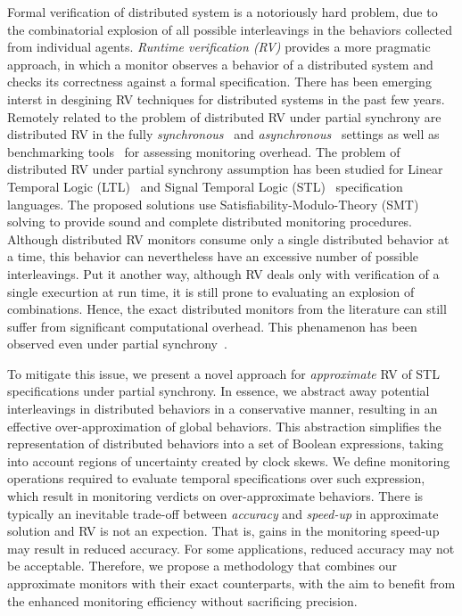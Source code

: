Formal verification of distributed system is a notoriously hard problem, due to the combinatorial 
explosion of all possible interleavings in the behaviors collected from individual agents.
%
 \emph{Runtime verification (RV)} provides a more pragmatic approach, in which a monitor observes 
 a behavior of a distributed system and checks its correctness against a formal specification.
There has been emerging interst in desgining RV techniques for distributed systems in the past few 
years.
%
Remotely related to the problem of distributed RV under partial synchrony are distributed RV in the 
fully {\em synchronous}~\cite{ef20,cf16,bf16} and {\em 
asynchronous}~\cite{cgnm13,mg05,og07,mb15,g20,bfrrt22} settings as well as  benchmarking 
tools~\cite{aafi21} for assessing monitoring overhead.
%
The problem of distributed RV under partial synchrony assumption has been studied for Linear 
 Temporal Logic (LTL)~\cite{GangulyMB20} and Signal Temporal Logic (STL)~\cite{MomtazAB23} 
 specification languages.
 The proposed solutions use Satisfiability-Modulo-Theory (SMT) solving to provide sound and 
 complete distributed monitoring procedures.
 Although distributed RV monitors consume only a single distributed behavior at a time, this behavior 
 can nevertheless have an excessive number of possible interleavings. 
 Put it another way, although RV deals only with verification of a single execurtion at run time, it is 
 still prone to evaluating an explosion of combinations.
 Hence, the exact distributed monitors from the literature can still suffer from significant 
 computational overhead.
 This phenamenon has been observed even under partial synchrony~\cite{GangulyMB20,gmb24}.
  

To mitigate this issue, we present a novel approach for \emph{approximate} RV of STL 
specifications under partial synchrony.
%
In essence, we abstract away potential interleavings in distributed behaviors in a conservative 
manner, resulting in an effective over-approximation of global behaviors.
%
This abstraction simplifies the representation of distributed behaviors into a set of Boolean 
expressions, taking into account regions of uncertainty created by clock skews.
%
We define monitoring operations required to evaluate temporal specifications over such expression, 
which result in monitoring verdicts on over-approximate behaviors.
%
There is typically an inevitable trade-off between {\em accuracy} and {\em speed-up} in approximate 
solution and  RV is not an expection.
%
That is, gains in the monitoring speed-up may result in reduced accuracy.
%
For some applications, reduced accuracy may not be acceptable.
%
Therefore, we propose a methodology that combines our approximate monitors with their exact 
counterparts, with the aim to benefit from the enhanced monitoring efficiency without sacrificing 
precision.



